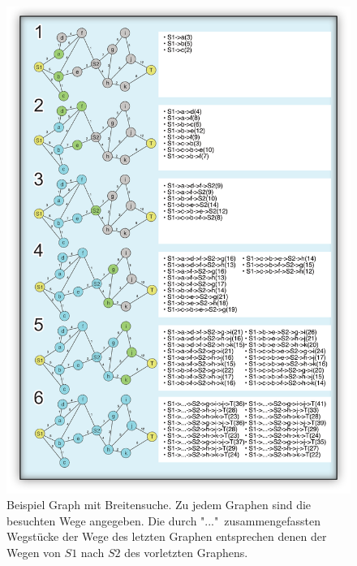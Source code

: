 \begin{figure}[h!]
	\centering
	\includegraphics[scale=0.76]{chapters/informed_search/BeispielGraphen1.png}
	\caption{Beispiel Graph mit Breitensuche. Zu jedem Graphen sind die besuchten Wege angegeben. Die durch "..."\ zusammengefassten Wegst\"ucke der Wege des letzten Graphen entsprechen denen der Wegen von $S1$ nach $S2$ des vorletzten Graphens.}
\end{figure}

